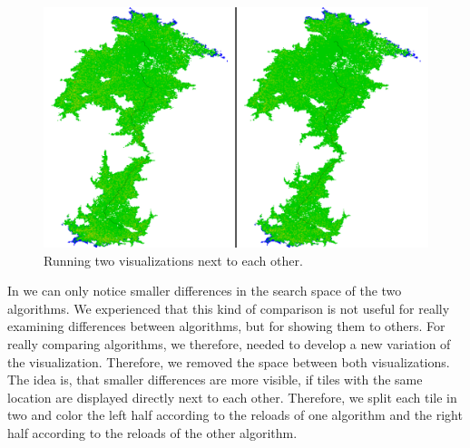 \documentclass
[
    paper = a4,
    pagesize,
    12 pt,
    oneside,                       %
    open = right,
    DIV = calc,
    BCOR = 0 mm,                   %
    bibtotoc
]
{scrbook}
\begin{document}
\begin{figure}
    \includegraphics[width=\textwidth]{Images/vis-compare-two.png}
\caption[]{Running two visualizations next to each other.}
\label{fig:two_visualization}
\end{figure}

In  we can only notice smaller differences in the search space of the two algorithms.
We experienced that this kind of comparison is not useful for really examining differences between algorithms, but for showing them to others.
For really comparing algorithms, we therefore, needed to develop a new variation of the visualization.
Therefore, we removed the space between both visualizations.
The idea is, that smaller differences are more visible, if tiles with the same location are displayed directly next to each other.
Therefore, we split each tile in two and color the left half according to the reloads of one algorithm and the right half according to the reloads of the other algorithm.
\end{document}
